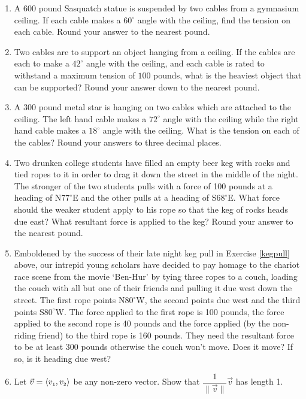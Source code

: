 \documentclass{ximera}
\begin{document}
\begin{enumerate}
\item  A $600$ pound Sasquatch statue is suspended by two cables from a gymnasium ceiling.  If  each cable makes a $60^{\circ}$ angle with the ceiling, find the tension on each cable.  Round your answer to the nearest pound.

\item  Two cables are to support an object hanging from a ceiling.  If the cables are each to make a $42^{\circ}$ angle with the ceiling, and each cable is rated to withstand a maximum tension of $100$ pounds, what is the heaviest object that can be supported?  Round your answer down to the nearest pound.

\item A $300$ pound metal star is hanging on two cables which are attached to the ceiling.  The left hand cable makes a $72^{\circ}$ angle with the ceiling while the right hand cable makes a $18^{\circ}$ angle with the ceiling.  What is the tension on each of the cables?  Round your answers to three decimal places.

\item Two drunken college students have filled an empty beer keg with rocks and tied ropes to it in order to drag it down the street in the middle of the night.  The stronger of the two students pulls with a force of 100 pounds at a heading of N$77^{\circ}$E and the other pulls at a heading of S$68^{\circ}$E.  What force should the weaker student apply to his rope so that the keg of rocks heads due east?  What resultant force is applied to the keg?  Round your answer to the nearest pound.
\label{kegpull}

\item Emboldened by the success of their late night keg pull in Exercise \ref{kegpull} above, our intrepid young scholars have decided to pay homage to the chariot race scene from the movie `Ben-Hur' by tying three ropes to a couch, loading the couch with all but one of their friends and pulling it due west down the street. The first rope points N$80^{\circ}$W, the second points due west and the third points S$80^{\circ}$W.  The force applied to the first rope is 100 pounds, the force applied to the second rope is 40 pounds and the force applied (by the non-riding friend) to the third rope is 160 pounds.  They need the resultant force to be at least 300 pounds otherwise the couch won't move.  Does it move?  If so, is it heading due west?

\item Let $\vec{v} = \langle v_{\text{\tiny $1$}}, v_{\text{\tiny $2$}} \rangle$ be any non-zero vector. Show that $\dfrac{1}{\|\vec{v}\|} \vec{v}$ has length 1.


\end{enumerate}
\end{document}
